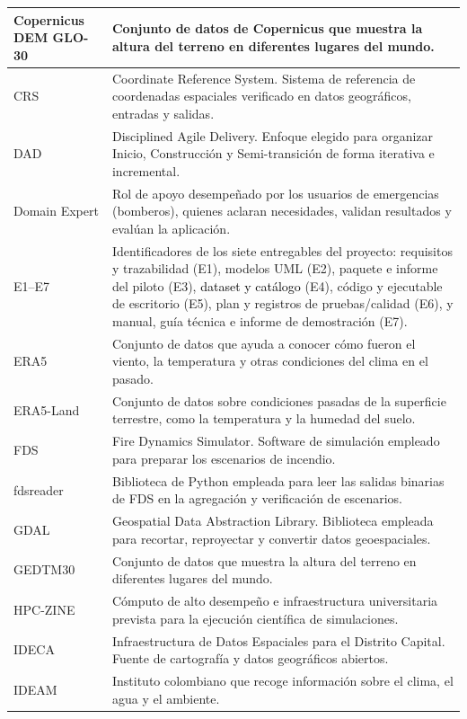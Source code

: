 \begin{longtable}{|p{0.29\dimexpr\linewidth-23pt\relax}|p{0.71\dimexpr\linewidth-23pt\relax}|}
Copernicus DEM GLO-30 & Conjunto de datos de Copernicus que muestra la altura del terreno en diferentes lugares del mundo.\\\hline
CRS & Coordinate Reference System. Sistema de referencia de coordenadas espaciales verificado en datos geográficos, entradas y salidas.\\\hline
DAD & Disciplined Agile Delivery. Enfoque elegido para organizar Inicio, Construcción y Semi-transición de forma iterativa e incremental.\\\hline
Domain Expert & Rol de apoyo desempeñado por los usuarios de emergencias (bomberos), quienes aclaran necesidades, validan resultados y evalúan la aplicación.\\\hline
E1--E7 & Identificadores de los siete entregables del proyecto: requisitos y trazabilidad (E1), modelos UML (E2), paquete e informe del piloto (E3), \textcolor{black}{dataset y catálogo} (E4), código y ejecutable de escritorio (E5), plan y registros de pruebas/calidad (E6), y manual, guía técnica e informe de demostración (E7).\\\hline
ERA5 & Conjunto de datos que ayuda a conocer cómo fueron el viento, la temperatura y otras condiciones del clima en el pasado.\\\hline
ERA5-Land & Conjunto de datos sobre condiciones pasadas de la superficie terrestre, como la temperatura y la humedad del suelo.\\\hline
FDS & Fire Dynamics Simulator. Software de simulación empleado para preparar los escenarios de incendio.\\\hline
fdsreader & Biblioteca de Python empleada para leer las salidas binarias de FDS en la agregación y verificación de escenarios.\\\hline
GDAL & Geospatial Data Abstraction Library. Biblioteca empleada para recortar, reproyectar y convertir datos geoespaciales.\\\hline
GEDTM30 & Conjunto de datos que muestra la altura del terreno en diferentes lugares del mundo.\\\hline
HPC-ZINE & Cómputo de alto desempeño e infraestructura universitaria prevista para la ejecución científica de simulaciones.\\\hline
IDECA & Infraestructura de Datos Espaciales para el Distrito Capital. Fuente de cartografía y datos geográficos abiertos.\\\hline
IDEAM & Instituto colombiano que recoge información sobre el clima, el agua y el ambiente.\\\hline

\end{longtable}
